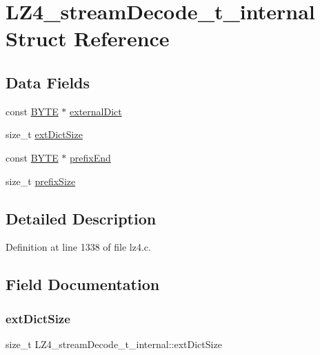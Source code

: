 \hypertarget{structLZ4__streamDecode__t__internal}{}\section{L\+Z4\+\_\+stream\+Decode\+\_\+t\+\_\+internal Struct Reference}
\label{structLZ4__streamDecode__t__internal}
\subsection*{Data Fields}
\begin{DoxyCompactItemize}
\item 
const \hyperlink{lz4_8c_a4ae1dab0fb4b072a66584546209e7d58}{B\+Y\+TE} $\ast$ \hyperlink{structLZ4__streamDecode__t__internal_a0edc5a25f4e1e84e48c1a60900dabd4f}{external\+Dict}
\item 
size\+\_\+t \hyperlink{structLZ4__streamDecode__t__internal_a6c8e2dcc2579727808da0bfe7a44eaa0}{ext\+Dict\+Size}
\item 
const \hyperlink{lz4_8c_a4ae1dab0fb4b072a66584546209e7d58}{B\+Y\+TE} $\ast$ \hyperlink{structLZ4__streamDecode__t__internal_ae54ddf8eaf34cbc8919fb0dea3a5cb60}{prefix\+End}
\item 
size\+\_\+t \hyperlink{structLZ4__streamDecode__t__internal_a44f5f7acc14c2bb3865eccd5372107c4}{prefix\+Size}
\end{DoxyCompactItemize}


\subsection{Detailed Description}


Definition at line 1338 of file lz4.\+c.



\subsection{Field Documentation}
\mbox{\label{structLZ4__streamDecode__t__internal_a6c8e2dcc2579727808da0bfe7a44eaa0}} 
\subsubsection{\texorpdfstring{ext\+Dict\+Size}{extDictSize}}
{\footnotesize\ttfamily size\+\_\+t L\+Z4\+\_\+stream\+Decode\+\_\+t\+\_\+internal\+::ext\+Dict\+Size}



